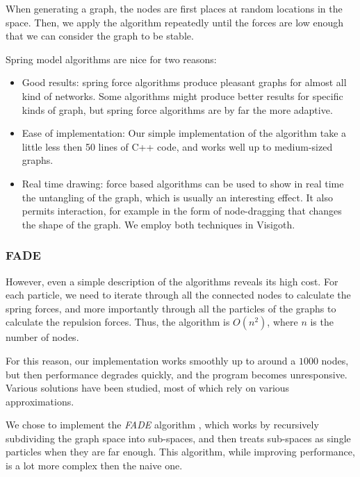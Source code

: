 \documentclass[a4paper,11pt,titlepage]{article}
\begin{document}
When generating a graph, the nodes are first places at random
locations in the space. Then, we apply the algorithm repeatedly until
the forces are low enough that we can consider the graph to be stable.

Spring model algorithms are nice for two reasons:

\begin{itemize}
\item Good results: spring force algorithms produce pleasant graphs
  for almost all kind of networks. Some algorithms might produce
  better results for specific kinds of graph, but spring force
  algorithms are by far the more adaptive.

\item Ease of implementation: Our simple implementation of the
  algorithm take a little less then 50 lines of C++ code, and works
  well up to medium-sized graphs.

\item Real time drawing: force based algorithms can be used to show in
  real time the untangling of the graph, which is usually an
  interesting effect. It also permits interaction, for example in the
  form of node-dragging that changes the shape of the graph. We employ
  both techniques in Visigoth.
\end{itemize}

\subsubsection{FADE}

However, even a simple description of the algorithms reveals its high
cost. For each particle, we need to iterate through all the connected
nodes to calculate the spring forces, and more importantly through all
the particles of the graphs to calculate the repulsion forces. Thus,
the algorithm is \(O(n^2)\), where \(n\) is the number of nodes.

For this reason, our implementation works smoothly up to around a
\(1000\) nodes, but then performance degrades quickly, and the program
becomes unresponsive. Various solutions have been studied, most of
which rely on various approximations.

We chose to implement the \emph{FADE} algorithm \cite{fade}, which works by
recursively subdividing the graph space into sub-spaces, and then
treats sub-spaces as single particles when they are far enough. This
algorithm, while improving performance, is a lot more complex then the
naive one.
\end{document}
